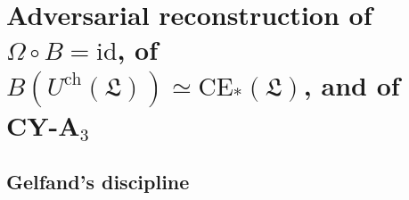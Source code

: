 
\providecommand{\ClaimStatusTheorem}{\textsuperscript{\textsc{[th]}}}
\providecommand{\ClaimStatusConjectured}{\textsuperscript{\textsc{[cj]}}}
\providecommand{\ClaimStatusDerivation}{\textsuperscript{\textsc{[dv]}}}
\providecommand{\ClaimStatusFalsified}{\textsuperscript{\textsc{[fx]}}}
\providecommand{\kch}{\kappa_{\mathrm{ch}}}
\providecommand{\kcat}{\kappa_{\mathrm{cat}}}
\providecommand{\Ran}{\mathrm{Ran}}
\providecommand{\HH}{\mathrm{HH}}
\providecommand{\CE}{\mathrm{CE}}
\providecommand{\Conv}{\mathrm{Conv}}
\providecommand{\MC}{\mathrm{MC}}
\providecommand{\Einf}{E_\infty}
\providecommand{\Eone}{E_1}
\providecommand{\Etwo}{E_2}
\providecommand{\Ethree}{E_3}
\providecommand{\Ainf}{A_\infty}
\providecommand{\Linf}{L_\infty}
\providecommand{\Sym}{\mathrm{Sym}}
\providecommand{\Coh}{\mathrm{Coh}}
\providecommand{\Perf}{\mathrm{Perf}}
\providecommand{\C}{\mathbb{C}}
\providecommand{\Z}{\mathbb{Z}}
\providecommand{\Q}{\mathbb{Q}}
\providecommand{\RHom}{\mathrm{RHom}}
\providecommand{\Rep}{\mathrm{Rep}}
\providecommand{\cA}{\mathcal{A}}
\providecommand{\cC}{\mathcal{C}}
\providecommand{\cH}{\mathcal{H}}
\providecommand{\cM}{\mathcal{M}}
\providecommand{\cO}{\mathcal{O}}
\providecommand{\cL}{\mathcal{L}}
\providecommand{\fL}{\mathfrak{L}}
\providecommand{\fg}{\mathfrak{g}}
\providecommand{\fh}{\mathfrak{h}}
\providecommand{\fgl}{\mathfrak{gl}}
\providecommand{\Alg}{\mathrm{Alg}}
\providecommand{\barB}{\overline{B}}
\providecommand{\barA}{\overline{A}}
\providecommand{\Zder}{Z^{\mathrm{der}}_{\mathrm{ch}}}
\providecommand{\Dg}[1]{D_{\mathrm{g=#1}}}
\providecommand{\Heis}{\mathrm{Heis}}

\section*{Adversarial reconstruction of $\Omega \circ B = \mathrm{id}$, of
  $B(U^{\mathrm{ch}}(\fL)) \simeq \CE_*(\fL)$, and of CY-A$_3$}

\subsection*{Gelfand's discipline}

